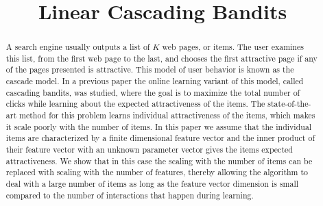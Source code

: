 \documentclass{article}
\title{Linear Cascading Bandits}
\author{}
\begin{document}
\maketitle

\begin{abstract}
A search engine usually outputs a list of $K$ web pages, or items. 
The user examines this list, from the first web page to the last, and chooses 
the first attractive page if any of the pages presented is attractive. 
This model of user behavior is known as the cascade model. 
In a previous paper the online learning variant of this model, called cascading bandits, was studied, where 
the goal is to maximize the total number of clicks while learning about the expected attractiveness of the items.
The state-of-the-art method for this problem learns individual attractiveness of the items, which makes it scale
poorly with the number of items. 
In this paper we assume that the individual items are characterized by a finite dimensional feature vector and the inner
product of their feature vector with an unknown parameter vector gives the items expected attractiveness.
We show that in this case the scaling with the number of items can be replaced with scaling with the number of features,
thereby allowing the algorithm to deal with a large number of items as long as the feature vector dimension is small
compared to the number of interactions that happen during learning.
\end{abstract}























\end{document}
